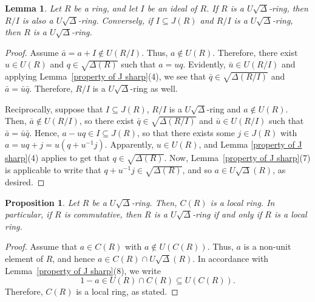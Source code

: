 \documentclass[11pt]{amsart}
\newtheorem{proposition}[theorem]{Proposition}
\newtheorem{lemma}[theorem]{Lemma}
\theoremstyle{definition}
\begin{document}
\begin{lemma}\label{facto}
Let \( R \) be a ring, and let \( I \) be an ideal of $R$. If $R$ is a $U\sqrt{\Delta}$-ring, then $R/I$ is also a $U\sqrt{\Delta}$-ring. Conversely, if \( I \subseteq J(R) \) and \( R/I \) is a $U\sqrt{\Delta}$-ring, then $R$ is a $U\sqrt{\Delta}$-ring.
\end{lemma}

\begin{proof}
Assume \( \bar a=a + I \notin U(R/I) \). Thus, \( a \notin U(R) \). Therefore, there exist \( u \in U(R) \) and \( q \in \sqrt{\Delta(R)} \) such that \( a = uq \).  Evidently, \( \bar{u} \in U(R/I) \) and applying Lemma~\ref{property of J sharp}(4), we see that $\bar q \in \sqrt{\Delta(R/I)}$ and \(\bar{a} = \bar{u} \bar{q} \). Therefore, $R/I$ is a $U\sqrt{\Delta}$-ring as well.

Reciprocally, suppose that \( I \subseteq J(R) \), \( R/I \) is a $U\sqrt{\Delta}$-ring and \( a \notin U(R) \). Then, \( \bar{a} \notin U(R/I) \), so there exist \( \bar{q} \in \sqrt{\Delta(R/I)} \) and \( \bar{u} \in U(R/I) \) such that \( \bar{a} = \bar{u}\bar{q} \). Hence, \( a - uq \in I \subseteq J(R) \), so that there exists some \( j \in J(R) \) with \( a = uq + j = u(q + u^{-1}j)\). Apparently, \( u \in U(R) \), and Lemma \ref{property of J sharp}(4) applies to get that \( q \in \sqrt{\Delta(R)} \). Now, Lemma~\ref{property of J sharp}(7) is applicable to write that \( q + u^{-1}j \in \sqrt{\Delta(R)} \), and so $a\in U\sqrt{\Delta}(R)$, as desired.
\end{proof}


\begin{proposition}\label{center UJ}
Let $R$ be a $U\sqrt{\Delta}$-ring. Then, $C(R)$ is a local ring. In particular, if $R$ is commutative, then $R$ is a $U\sqrt{\Delta}$-ring if and only if $R$ is a local ring.
\end{proposition}

\begin{proof}
Assume that $a\in C(R)$ with $a\not\in U(C(R))$. Thus, $a$ is a non-unit element of $R$, and hence $a\in C(R)\cap U\sqrt{\Delta}(R)$. In accordance with Lemma~\ref{property of J sharp}(8), we write
\[
1-a\in U(R)\cap C(R)\subseteq U(C(R)).
\]
Therefore, $C(R)$ is a local ring, as stated.
\end{proof}

\end{document}
